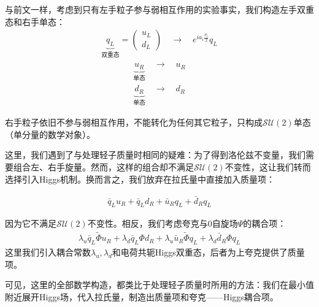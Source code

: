 与前文一样，考虑到只有左手粒子参与弱相互作用的实验事实，我们构造左手双重态和右手单态：
\begin{align}
\underbrace{q_L}_{\text{双重态}}=\begin{pmatrix}u_L\\d_L\end{pmatrix}\quad\rightarrow\quad e^{ia_i\frac{\sigma_i}{2}}q_L
\label{equ7.127}
\end{align}
\begin{align}
\underbrace{u_R}_{\text{单态}}\quad\rightarrow\quad u_R\nonumber\\
\underbrace{d_R}_{\text{单态}}\quad\rightarrow\quad d_R
\label{equ7.128}
\end{align}

右手粒子依旧不参与弱相互作用，不能转化为任何其它粒子，只构成$\mathcal{SU}(2)$单态（单分量的数学对象）。

这里，我们遇到了与处理轻子质量时相同的疑难：为了得到洛伦兹不变量，我们需要组合左、右手旋量。然而，这样的组合却不满足$\mathcal{SU}(2)$不变性，这让我们转而选择引入Higgs机制。换而言之，我们放弃在拉氏量中直接加入质量项：

\begin{align}
\bar{q}_Lu_R+\bar{q}_Ld_R+\bar{u}_Rq_L+\bar{d}_Rq_L
\label{equ7.129}
\end{align}

因为它不满足$\mathcal{SU}(2)$不变性。相反，我们考虑夸克与0自旋场$\Psi$的耦合项：
\begin{align}
\lambda_u\bar{q}_L\tilde{\Phi}u_R+\lambda_d\bar{q}_L\Phi d_R+\lambda_u\bar{u}_R\tilde{\Phi}q_L+\lambda_d\bar{d}_R{\Phi}q_L
\label{equ7.130}
\end{align}
这里我们引入耦合常数$\lambda_u,\lambda_d$和电荷共轭Higgs双重态，后者为上夸克提供了质量项。

可见，这里的全部数学构造，都类比于处理轻子质量时所用的方法：我们在最小值附近展开Higgs场，代入拉氏量，制造出质量项和夸克——Higgs耦合项。

